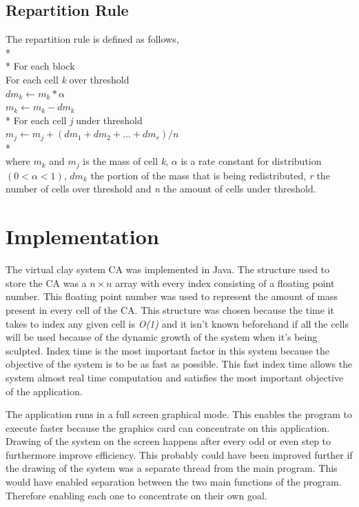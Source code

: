 \documentclass[a4paper,11pt,titlepage]{article}
\begin{document}
\subsection {Repartition Rule}
The repartition rule is defined as follows,\\*
\\*
For each block\\
For each cell \emph{k} over threshold\\
	$ dm_k \gets m_k * \alpha $\\
	$ m_k \gets m_k - dm_k$\\*
For each cell \emph{j} under threshold\\
	$m_j \gets m_j + ( dm_1 + dm_2 +... + dm_r ) / n$\\*
\\
where $m_k$ and $m_j$ is the mass of cell \emph{k}, $\alpha$ is a rate constant for distribution $( 0 < \alpha < 1 )$, $dm_k$ the portion of the mass that is being redistributed, \emph{r} the number of cells over threshold and \emph{n} the amount of cells under threshold.
\newpage
\section{Implementation}
The virtual clay system CA was implemented in Java. The structure used to store the CA was a $n \times n$ array with every index consisting of a floating point number.
This floating point number was used to represent the amount of mass present in every cell of the CA. This structure was chosen because the time it takes to index any given cell is \emph{O(1)} and it isn't known beforehand if all the cells will be used because of the dynamic growth of the system when it's being sculpted.
Index time is the most important factor in this system because the objective of the system is to be as fast as possible. This fast index time allows the system almost real time computation and satisfies the most important objective of the application.

The application runs in a full screen graphical mode. This enables the program to execute faster because the graphics card can concentrate on this application. Drawing of the system on the screen happens after every odd or even step to furthermore improve efficiency. This probably could have been improved further if the drawing of the system was a separate thread from the main program.
This would have enabled separation between the two main functions of the program. Therefore enabling each one to concentrate on their own goal.
\end{document}
